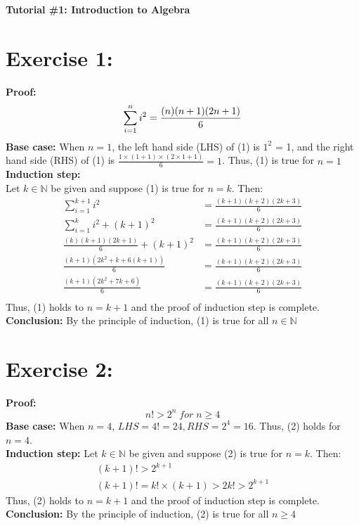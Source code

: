 \documentclass{article}
\newcommand{\N}{\mathbb{N}}
\begin{document}
	\centering
	\LARGE\textbf{Tutorial \#1: Introduction to Algebra}
	
	\justifying
	\section{Exercise 1:}
		\Large\textbf{Proof:}
		\begin{equation}
			\sum_{i=1}^{n} i^2 = \frac{(n)(n+1)(2n+1)}{6}\\
		\end{equation}
		\Large\textbf{Base case:}
		When $n = 1$, the left hand side (LHS) of (1) is $1^2$ = 1, and the right hand side (RHS) of (1) is $\frac{1\times(1 + 1)\times(2\times1 + 1)}{6} = 1$. Thus, (1) is true for $n=1$\\
		\Large\textbf{Induction step:}\\
		Let $k \in \N$ be given and suppose (1) is true for $n = k.$ Then:\\
		\begin{align*}
			\sum_{i=1}^{k+1} i^2 &= \frac{(k+1)(k+2)(2k+3)}{6}\\
			\sum_{i=1}^{k} i^2 + (k+1)^2 &= \frac{(k+1)(k+2)(2k+3)}{6}\\
			\frac{(k)(k+1)(2k+1)}{6} + (k+1)^2 &= \frac{(k+1)(k+2)(2k+3)}{6}\\
			\frac{(k+1)(2k^2+k+6(k+1))}{6} &= \frac{(k+1)(k+2)(2k+3)}{6}\\
			\frac{(k+1)(2k^2+7k+6)}{6} &= \frac{(k+1)(k+2)(2k+3)}{6}\\
		\end{align*}
		Thus, (1) holds to $n = k + 1$ and the proof of induction step is complete.\\
		\Large\textbf{Conclusion:} By the principle of induction, (1) is true for all $n \in \N$

	\section{Exercise 2:}
		\Large\textbf{Proof:}
		\begin{equation}
			n! > 2^n \; for \; n \ge 4
		\end{equation}
		\Large\textbf{Base case:}
		When $n=4$, $LHS = 4! = 24, RHS = 2^4 = 16.$ Thus, (2) holds for $n=4$.\\
		\Large\textbf{Induction step:}
		Let $k \in \N$ be given and suppose (2) is true for $n = k.$ Then:\\
		\begin{align*}
			(k+1)! > 2^{k+1}\\
			(k+1)! = k!\times(k+1) > 2k! > 2^{k+1}
		\end{align*}
		Thus, (2) holds to $n=k+1$ and the proof of induction step is complete.\\
		\Large\textbf{Conclusion:} By the principle of induction, (2) is true for all $n \ge 4$
	
\end{document}
